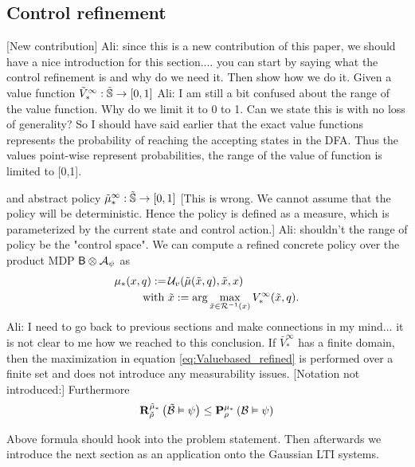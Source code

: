 \documentclass{ifacconf}
\newcommand{\red}[1]{{\color{red} #1}}
\renewcommand{\axx}[1]{{\color{orange} Ali: #1}}
\begin{document}
\subsection{Control refinement}
\red{[New contribution]}
\axx{since this is a new contribution of this paper, we should have a nice introduction for this section.... you can start by saying what the control refinement is and why do we need it. Then show how we do it.}
Given a value function 
	$\tilde V^\infty_\ast:\tilde\S \rightarrow [0,1]$ \axx{I am still a bit confused about the range of the value function. Why do we limit it to 0 to 1. Can we state this is with no loss of generality?} \red{So I should have said earlier that the exact value functions represents the probability of reaching the accepting states in the DFA. Thus the values point-wise represent probabilities, the range of the value of function is limited to [0,1]. }
	
	and abstract policy 	\red{$\tilde  \pol^\infty_\ast:\tilde\S \rightarrow [0,1]$ [This is wrong.  We cannot assume that the policy will be deterministic. Hence the policy is defined as a measure, which is parameterized by the current state and control action.] }\axx{shouldn't the range of policy be the "control space"}. We can compute a refined  concrete policy over the product MDP $\MB\otimes\FSA_\psi$ as
	\begin{align}\label{eq:Valuebased_refined}
		\pol_\ast(x,q):=\, &\InF( \tilde{\pol}(\tilde x, q), \tilde x, x) \\ \mbox{ with } &\tilde x:=\arg\max_{ \tilde x\in
		\rel^{-1}(x)} \bar V^\infty_\ast(\tilde x,q).
	\end{align}
\axx{I need to go back to previous sections and make connections in my mind... it is not clear to me how we reached to this conclusion.}
If  $\bar V^\infty_\ast$ has a finite domain, then  the maximization in equation \eqref{eq:Valuebased_refined} is performed over a finite set and does not introduce any measurability issues. 	\red{[Notation not introduced:]}
	Furthermore
\begin{align}
  \mathbf R^{\tilde \pol_\ast}_{\tilde\rho}\left(
\tilde{\mathcal{B}}
 \vDash \psi \right)\leq   \mathbf P^{ \pol_\ast} _{ \rho}\left(
 {\mathcal{B}}
 \vDash \psi \right)
\end{align}
 
\red{Above formula should hook into the problem statement. Then afterwards we introduce the next section as an application onto the Gaussian LTI systems.}
 
\end{document}
